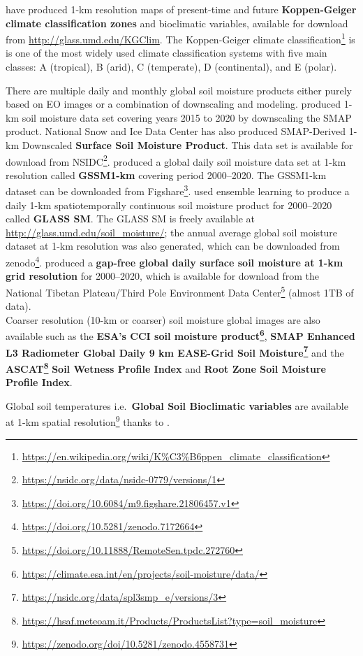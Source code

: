\documentclass[
  graybox,natbib,nospthms]{svmono}
\renewcommand{\href}[2]{#2 (\url{#1})}
\renewcommand{\href}[2]{#2\footnote{\url{#1}}}
\begin{document}
\citet{cui20211} have produced 1-km resolution maps of present-time and future \textbf{Koppen-Geiger climate
classification zones} and bioclimatic variables, available for download from \url{http://glass.umd.edu/KGClim}.
The \href{https://en.wikipedia.org/wiki/K\%C3\%B6ppen_climate_classification}{Koppen-Geiger climate classification} is
is one of the most widely used climate classification systems with five main classes: A (tropical), B (arid),
C (temperate), D (continental), and E (polar).

There are multiple daily and monthly global soil moisture products either purely based
on EO images or a combination of downscaling and modeling.
\citet{Fang2022} produced 1-km soil moisture data set covering years 2015 to 2020 by downscaling the SMAP product.
National Snow and Ice Data Center has also produced SMAP-Derived 1-km Downscaled \textbf{Surface Soil Moisture Product}.
This data set is available for download from \href{https://nsidc.org/data/nsidc-0779/versions/1}{NSIDC}.
\citet{han2023global} produced a global daily soil moisture data set at 1-km
resolution called \textbf{GSSM1-km} covering period 2000--2020.
The GSSM1-km dataset can be downloaded from \href{https://doi.org/10.6084/m9.figshare.21806457.v1}{Figshare}.
\citet{Zhang2023} used ensemble learning to produce a daily 1-km spatiotemporally continuous soil moisture product for 2000--2020 called \textbf{GLASS SM}.
The GLASS SM is freely available at \url{http://glass.umd.edu/soil_moisture/}; the annual average global soil moisture dataset at 1-km resolution was also generated, which can be downloaded from \href{https://doi.org/10.5281/zenodo.7172664}{zenodo}.
\citet{zheng202321} produced a \textbf{gap-free global daily surface soil moisture at 1-km grid resolution}
for 2000--2020, which is available for download from the \href{https://doi.org/10.11888/RemoteSen.tpdc.272760}{National Tibetan Plateau/Third Pole Environment Data Center} (almost 1TB of data).\\
Coarser resolution (10-km or coarser) soil moisture global images are also
available such as the \textbf{\href{https://climate.esa.int/en/projects/soil-moisture/data/}{ESA's CCI soil moisture product}},
\textbf{\href{https://nsidc.org/data/spl3smp_e/versions/3}{SMAP Enhanced L3 Radiometer Global Daily 9 km EASE-Grid Soil Moisture}} and
the \textbf{\href{https://hsaf.meteoam.it/Products/ProductsList?type=soil_moisture}{ASCAT}} \textbf{Soil Wetness Profile Index} and \textbf{Root Zone Soil Moisture Profile Index}.

Global soil temperatures i.e.~\textbf{Global Soil Bioclimatic variables} are available at \href{https://zenodo.org/doi/10.5281/zenodo.4558731}{1-km spatial resolution} thanks to \citet{lembrechts2022global}.
\end{document}
